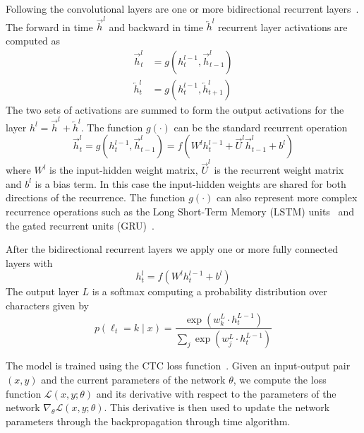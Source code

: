 Following the convolutional layers are one or more bidirectional recurrent
layers~\cite{schuster1997bidirectional}. The forward in time
$\overrightarrow{h}^l$ and backward in time $\overleftarrow{h}^l$ recurrent
layer activations are computed as
\begin{equation*}
\begin{aligned}
    \overrightarrow{h}_t^l &= g( h_t^{l-1}, \overrightarrow{h}_{t-1}^l ) \\
    \overleftarrow{h}_t^l &= g( h_t^{l-1}, \overleftarrow{h}_{t+1}^l )
\end{aligned}
\end{equation*}
The two sets of activations are summed to form the output activations for the
layer $h^l = \overrightarrow{h}^l + \overleftarrow{h}^l$.  The function
$g(\cdot)$ can be the standard recurrent operation
\begin{equation}
    \overrightarrow{h}_t^l = g( h_t^{l-1}, \overrightarrow{h}_{t-1}^l )
        = f( W^l h_t^{l-1} + \overrightarrow{U}^l \overrightarrow{h}_{t-1}^l + b^l )
    \label{eq:deepspeech2:plainrnn}
\end{equation}
where $W^l$ is the input-hidden weight matrix, $\overrightarrow{U}^l$ is the
recurrent weight matrix and $b^l$ is a bias term. In this case the input-hidden
weights are shared for both directions of the recurrence. The function
$g(\cdot)$ can also represent more complex recurrence operations such as the
Long Short-Term Memory (LSTM) units~\cite{hochreiter1997} and the gated
recurrent units (GRU)~\cite{cho2014}.

After the bidirectional recurrent layers we apply one or more fully connected layers with
\begin{equation*}
    h^l_t = f( W^l h^{l-1}_t + b^l )
\end{equation*}
The output layer $L$ is a softmax computing a probability distribution over characters given by
\begin{equation*}
    p(\ell_t=k \mid x) = \frac{\exp(w^L_k \cdot h^{L-1}_t)}{\sum_j \exp(w^L_j \cdot h^{L-1}_t)}
\end{equation*}

The model is trained using the CTC loss function~\cite{graves2006}. Given an
input-output pair $(x, y)$ and the current parameters of the network $\theta$,
we compute the loss function $\mathcal{L}(x, y; \theta)$ and its derivative
with respect to the parameters of the network $\nabla_\theta \mathcal{L}(x, y;
\theta)$. This derivative is then used to update the network parameters through
the backpropagation through time algorithm.

